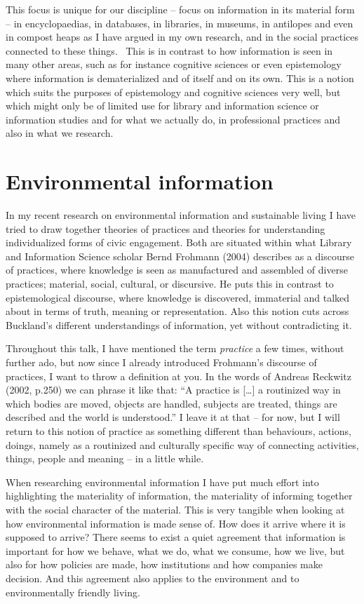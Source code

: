 \documentclass[a4paper,
fontsize=11pt,
oneside,
numbers=noperiodatend,
parskip=half-,
bibliography=totoc,
final
]{scrartcl}
\begin{document}
This focus is unique for our discipline -- focus on information in its
material form -- in encyclopaedias, in databases, in libraries, in
museums, in antilopes and even in compost heaps as I have argued in my
own research, and in the social practices connected to these things.~
This is in contrast to how information is seen in many other areas, such
as for instance cognitive sciences or even epistemology where
information is dematerialized and of itself and on its own. This is a
notion which suits the purposes of epistemology and cognitive sciences
very well, but which might only be of limited use for library and
information science or information studies and for what we actually do,
in professional practices and also in what we research.

\section*{Environmental
information}\label{environmental-information}

In my recent research on environmental information and sustainable
living I have tried to draw together theories of practices and theories
for understanding individualized forms of civic engagement. Both are
situated within what Library and Information Science scholar Bernd
Frohmann (2004) describes as a discourse of practices, where knowledge
is seen as manufactured and assembled of diverse practices; material,
social, cultural, or discursive. He puts this in contrast to
epistemological discourse, where knowledge is discovered, immaterial and
talked about in terms of truth, meaning or representation. Also this
notion cuts across Buckland's different understandings of information,
yet without contradicting it.

Throughout this talk, I have mentioned the term \emph{practice} a few
times, without further ado, but now since I already introduced
Frohmann's discourse of practices, I want to throw a definition at you.
In the words of Andreas Reckwitz (2002, p.250) we can phrase it like
that: \enquote{A practice is {[}\ldots{}{]} a routinized way in which
bodies are moved, objects are handled, subjects are treated, things are
described and the world is understood.} I leave it at that -- for now,
but I will return to this notion of practice as something different than
behaviours, actions, doings, namely as a routinized and culturally
specific way of connecting activities, things, people and meaning -- in
a little while.

When researching environmental information I have put much effort into
highlighting the materiality of information, the materiality of
informing together with the social character of the material. This is
very tangible when looking at how environmental information is made
sense of. How does it arrive where it is supposed to arrive? There seems
to exist a quiet agreement that information is important for how we
behave, what we do, what we consume, how we live, but also for how
policies are made, how institutions and how companies make decision. And
this agreement also applies to the environment and to environmentally
friendly living.
\end{document}
